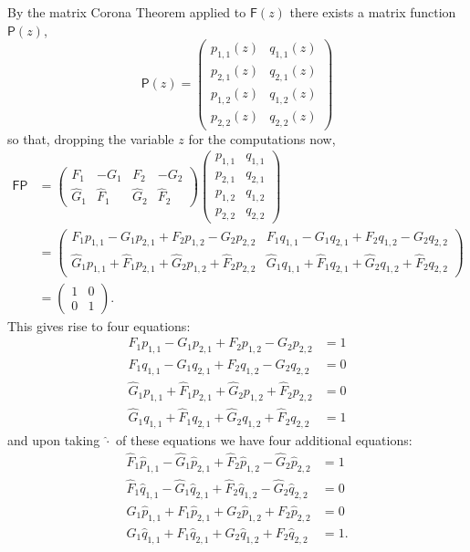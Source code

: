 \documentclass[11pt]{amsart}
\begin{document}
By the matrix Corona Theorem applied to $\mathsf{F}(z)$ there exists a matrix function $\mathsf{P}(z)$,
$$
\mathsf{P}(z)=
\left(
\begin{array}{cc}
 p_{1,1}(z) & q_{1,1}(z) \\
 p_{2,1}(z) & q_{2,1}(z) \\
 p_{1,2}(z) & q_{1,2}(z) \\
 p_{2,2}(z) & q_{2,2}(z)
\end{array}
\right)
$$
so that, dropping the variable $z$ for the computations now,
\begin{align*}
\mathsf{F}\mathsf{P} & =\left(
\begin{array}{cccc}
F_1 & -G_1 & F_2 & -G_2 \\
\hat G_1 & \hat F_1 & \hat G_2 & \hat F_2
\end{array}
\right)
\left(
\begin{array}{cc}
 p_{1,1} & q_{1,1} \\
 p_{2,1} & q_{2,1} \\
 p_{1,2} & q_{1,2} \\
 p_{2,2} & q_{2,2}
\end{array}
\right)\\
&=
\left(
\begin{array}{cc}
 F_1 p_{1,1} - G_1 p_{2,1} + F_2 p_{1,2} - G_2 p_{2,2} & F_1 q_{1,1} - G_1 q_{2,1} + F_2 q_{1,2} - G_2 q_{2,2} \\
 \hat G_1 p_{1,1} + \hat F_1 p_{2,1} + \hat G_2 p_{1,2} + \hat F_2 p_{2,2} & \hat G_1 q_{1,1} + \hat F_1 q_{2,1} + \hat G_2 q_{1,2} + \hat F_2 q_{2,2}
\end{array}
\right)\\
& =
\left(
\begin{array}{cc}
 1 & 0 \\
 0 & 1
\end{array}
\right).
\end{align*}
This gives rise to four equations:
\begin{align}
 F_1 p_{1,1} - G_1 p_{2,1} + F_2 p_{1,2} - G_2 p_{2,2}  & = 1\label{e:s1e1}\\
 F_1 q_{1,1} - G_1 q_{2,1} + F_2 q_{1,2} - G_2 q_{2,2} & = 0\label{e:s1e2}\\
 \hat G_1 p_{1,1} + \hat F_1 p_{2,1} + \hat G_2 p_{1,2} + \hat F_2 p_{2,2} & = 0\label{e:s1e3}\\
 \hat G_1 q_{1,1} + \hat F_1 q_{2,1} + \hat G_2 q_{1,2} + \hat F_2 q_{2,2}  & = 1\label{e:s1e4}
\end{align}
and upon taking $\hat{\cdot}$ of these equations we have four additional equations:
\begin{align}
 \hat F_1 \hat p_{1,1} - \hat G_1 \hat p_{2,1} + \hat F_2 \hat p_{1,2} - \hat G_2 \hat p_{2,2}  & = 1\label{e:s2e1}\\
 \hat F_1 \hat q_{1,1} - \hat G_1 \hat q_{2,1} + \hat F_2 \hat q_{1,2} - \hat G_2 \hat q_{2,2} & = 0\label{e:s2e2}\\
 G_1 \hat p_{1,1} + F_1 \hat p_{2,1} + G_2 \hat p_{1,2} + F_2 \hat p_{2,2} & = 0\label{e:s2e3}\\
 G_1 \hat q_{1,1} + F_1 \hat q_{2,1} + G_2 \hat q_{1,2} + F_2 \hat q_{2,2}  & = 1.\label{e:s2e4}
\end{align}
\end{document}
